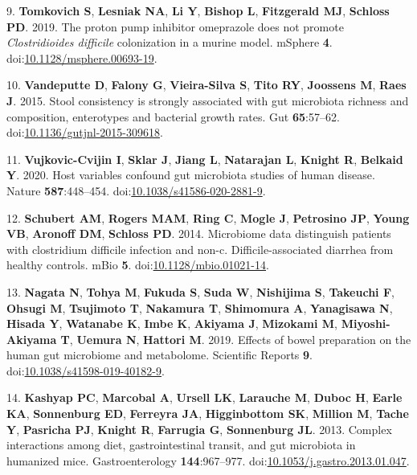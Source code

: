 \documentclass[
  11pt,
]{article}
\begin{document}
\leavevmode\hypertarget{ref-Tomkovich2019}{}%
9. \textbf{Tomkovich S}, \textbf{Lesniak NA}, \textbf{Li Y},
\textbf{Bishop L}, \textbf{Fitzgerald MJ}, \textbf{Schloss PD}. 2019.
The proton pump inhibitor omeprazole does not promote
\emph{Clostridioides difficile} colonization in a murine model. mSphere
\textbf{4}.
doi:\href{https://doi.org/10.1128/msphere.00693-19}{10.1128/msphere.00693-19}.

\leavevmode\hypertarget{ref-Vandeputte2015}{}%
10. \textbf{Vandeputte D}, \textbf{Falony G}, \textbf{Vieira-Silva S},
\textbf{Tito RY}, \textbf{Joossens M}, \textbf{Raes J}. 2015. Stool
consistency is strongly associated with gut microbiota richness and
composition, enterotypes and bacterial growth rates. Gut
\textbf{65}:57--62.
doi:\href{https://doi.org/10.1136/gutjnl-2015-309618}{10.1136/gutjnl-2015-309618}.

\leavevmode\hypertarget{ref-VujkovicCvijin2020}{}%
11. \textbf{Vujkovic-Cvijin I}, \textbf{Sklar J}, \textbf{Jiang L},
\textbf{Natarajan L}, \textbf{Knight R}, \textbf{Belkaid Y}. 2020. Host
variables confound gut microbiota studies of human disease. Nature
\textbf{587}:448--454.
doi:\href{https://doi.org/10.1038/s41586-020-2881-9}{10.1038/s41586-020-2881-9}.

\leavevmode\hypertarget{ref-Schubert2014}{}%
12. \textbf{Schubert AM}, \textbf{Rogers MAM}, \textbf{Ring C},
\textbf{Mogle J}, \textbf{Petrosino JP}, \textbf{Young VB},
\textbf{Aronoff DM}, \textbf{Schloss PD}. 2014. Microbiome data
distinguish patients with clostridium difficile infection and non-c.
Difficile-associated diarrhea from healthy controls. mBio \textbf{5}.
doi:\href{https://doi.org/10.1128/mbio.01021-14}{10.1128/mbio.01021-14}.

\leavevmode\hypertarget{ref-Nagata2019}{}%
13. \textbf{Nagata N}, \textbf{Tohya M}, \textbf{Fukuda S}, \textbf{Suda
W}, \textbf{Nishijima S}, \textbf{Takeuchi F}, \textbf{Ohsugi M},
\textbf{Tsujimoto T}, \textbf{Nakamura T}, \textbf{Shimomura A},
\textbf{Yanagisawa N}, \textbf{Hisada Y}, \textbf{Watanabe K},
\textbf{Imbe K}, \textbf{Akiyama J}, \textbf{Mizokami M},
\textbf{Miyoshi-Akiyama T}, \textbf{Uemura N}, \textbf{Hattori M}. 2019.
Effects of bowel preparation on the human gut microbiome and metabolome.
Scientific Reports \textbf{9}.
doi:\href{https://doi.org/10.1038/s41598-019-40182-9}{10.1038/s41598-019-40182-9}.

\leavevmode\hypertarget{ref-Kashyap2013}{}%
14. \textbf{Kashyap PC}, \textbf{Marcobal A}, \textbf{Ursell LK},
\textbf{Larauche M}, \textbf{Duboc H}, \textbf{Earle KA},
\textbf{Sonnenburg ED}, \textbf{Ferreyra JA}, \textbf{Higginbottom SK},
\textbf{Million M}, \textbf{Tache Y}, \textbf{Pasricha PJ},
\textbf{Knight R}, \textbf{Farrugia G}, \textbf{Sonnenburg JL}. 2013.
Complex interactions among diet, gastrointestinal transit, and gut
microbiota in humanized mice. Gastroenterology \textbf{144}:967--977.
doi:\href{https://doi.org/10.1053/j.gastro.2013.01.047}{10.1053/j.gastro.2013.01.047}.
\end{document}
